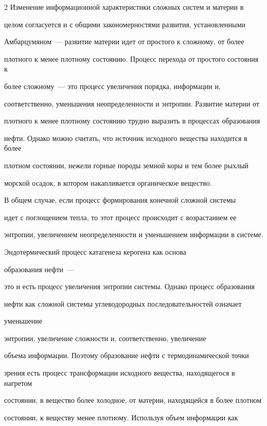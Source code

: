 \begin{multicols}{2}
     Изменение информационной характеристики сложных систем и материи в 

целом согласуется и с общими закономерностями развития, уста\-нов\-лен\-ны\-ми 

Амбарцумяном~--- развитие материи идет от простого к сложному, от более 

плотного к менее плотному состоянию. Процесс перехода от простого состояния к 

более сложному~--- это процесс увеличения порядка, информации и, 

соответственно, уменьшения неопределенности и энтропии. Развитие материи от 

плотного к менее плотному состоянию трудно выразить в процессах образования 

нефти. Однако можно считать, что источник исходного вещества находится в более 

плотном состоянии, нежели горные породы земной коры и тем более рыхлый 

морской осадок, в котором накапливается органическое вещество.

     

     В общем случае, если процесс формирования конечной сложной системы 

идет с поглощением тепла, то этот процесс происходит с возрастанием ее 

энтропии, увеличением неопределенности и уменьшением информации в системе. 

Эндотермический процесс катагенеза керогена как основа\linebreak

образования нефти~--- 

это и есть процесс увеличения энтропии системы. Однако процесс образования 

нефти как сложной системы углеводородных последовательностей означает 

уменьшение\linebreak

 энтропии, увеличение сложности и, соответственно, увеличение 

объема информации. Поэтому образование нефти с термодинамической точки 

зрения есть процесс трансформации исходного вещества, находящегося в нагретом 

состоянии, в вещество более холодное, от материи, находящейся в более плотном 

состоянии, к веществу менее плотному. Используя объем информации как 


\end{multicols}
